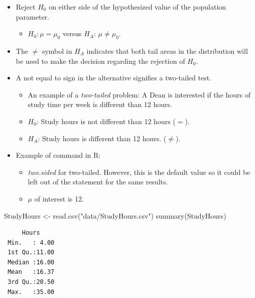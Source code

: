 \documentclass[
  letterpaper,
  DIV=11,
  numbers=noendperiod]{scrreprt}
\newenvironment{Shaded}{\begin{snugshade}}{\end{snugshade}}
\newcommand{\FunctionTok}[1]{\textcolor[rgb]{0.28,0.35,0.67}{#1}}
\newcommand{\NormalTok}[1]{\textcolor[rgb]{0.00,0.23,0.31}{#1}}
\newcommand{\OtherTok}[1]{\textcolor[rgb]{0.00,0.23,0.31}{#1}}
\newcommand{\StringTok}[1]{\textcolor[rgb]{0.13,0.47,0.30}{#1}}
\providecommand{\tightlist}{%
  \setlength{\itemsep}{0pt}\setlength{\parskip}{0pt}}\usepackage{longtable,booktabs,array}
\begin{document}
\begin{itemize}
\item
  Reject \(H_0\) on either side of the hypothesized value of the
  population parameter.

  \begin{itemize}
  \tightlist
  \item
    \(H_0: \mu =\mu_0\) versus \(H_A\): \(\mu \neq \mu_0\).
  \end{itemize}
\item
  The \(\neq\) symbol in \(H_A\) indicates that both tail areas in the
  distribution will be used to make the decision regarding the rejection
  of \(H_0\).
\item
  A not equal to sign in the alternative signifies a two-tailed test.

  \begin{itemize}
  \tightlist
  \item
    An example of a \emph{two-tailed} problem: A Dean is interested if
    the hours of study time per week is different than 12 hours.
  \item
    \(H_0\): Study hours is not different than 12 hours (\(=\)).
  \item
    \(H_A\): Study hours is different than 12 hours. (\(\neq\)).
  \end{itemize}
\item
  Example of command in R:

  \begin{itemize}
  \tightlist
  \item
    \emph{two.sided} for two-tailed. However, this is the default value
    so it could be left out of the statement for the same results.
  \item
    \emph{\(\mu\)} of interest is 12.
  \end{itemize}
\end{itemize}

\begin{Shaded}
\begin{Highlighting}[]
\NormalTok{StudyHours }\OtherTok{\textless{}{-}} \FunctionTok{read.csv}\NormalTok{(}\StringTok{"data/StudyHours.csv"}\NormalTok{)}
\FunctionTok{summary}\NormalTok{(StudyHours)}
\end{Highlighting}
\end{Shaded}

\begin{verbatim}
     Hours      
 Min.   : 4.00  
 1st Qu.:11.00  
 Median :16.00  
 Mean   :16.37  
 3rd Qu.:20.50  
 Max.   :35.00  
\end{verbatim}
\end{document}

